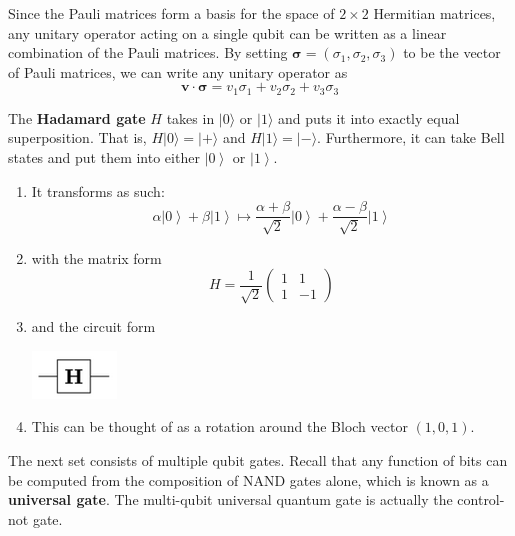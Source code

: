 \documentclass{article}
\newcommand{\ket}[1]{\ensuremath{\left|#1\right\rangle}}
\begin{document}
    Since the Pauli matrices form a basis for the space of $2 \times 2$ Hermitian matrices, any unitary operator acting on a single qubit can be written as a linear combination of the Pauli matrices. By setting $\boldsymbol{\sigma} = (\sigma_1, \sigma_2, \sigma_3)$ to be the vector of Pauli matrices, we can write any unitary operator as 
    \begin{equation}
       \mathbf{v} \cdot \boldsymbol{\sigma} = v_1 \sigma_1 + v_2 \sigma_2 + v_3 \sigma_3
    \end{equation}

    \begin{definition}[Hadamard]
      The \textbf{Hadamard gate} $H$ takes in $|0\rangle$ or $|1\rangle$ and puts it into exactly equal superposition. That is, $H|0\rangle = |+\rangle$ and $H|1\rangle = |-\rangle$. Furthermore, it can take Bell states and put them into either $\ket{0}$ or $\ket{1}$. 
      \begin{enumerate} 
        \item It transforms as such: 
          \begin{equation} 
            \alpha \ket{0} + \beta \ket{1} \mapsto \frac{\alpha + \beta}{\sqrt{2}} \ket{0} + \frac{\alpha - \beta}{\sqrt{2}} \ket{1}
          \end{equation}
        \item with the matrix form 
          \begin{equation} 
            H = \frac{1}{\sqrt{2}} \begin{pmatrix} 1 & 1 \\ 1 & -1 \end{pmatrix}
          \end{equation}
        \item and the circuit form 
          \begin{center}
            \includegraphics[scale=0.5]{img/Hadamard_gate.png}
          \end{center}
        \item This can be thought of as a rotation around the Bloch vector $(1, 0, 1)$.
      \end{enumerate}
    \end{definition}

    The next set consists of multiple qubit gates. Recall that any function of bits can be computed from the composition of NAND gates alone, which is known as a \textbf{universal gate}. The multi-qubit universal quantum gate is actually the control-not gate.
\end{document}
